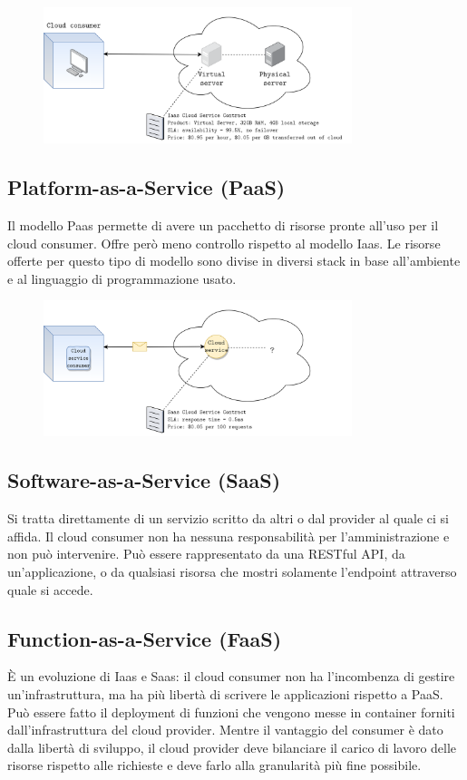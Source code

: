 \begin{figure}[ht]
    \centering
    \includegraphics[width=9cm]{./Images/cap3/3.3.png}
    \label{fig:image3.3}
\end{figure}

\subsection{Platform-as-a-Service (PaaS)}
Il modello Paas permette di avere un pacchetto di risorse pronte all'uso per il cloud consumer. Offre però meno controllo rispetto al modello Iaas. Le risorse offerte per questo tipo di modello sono divise in diversi stack in base all'ambiente e al linguaggio di programmazione usato. 

\begin{figure}[ht]
    \centering
    \includegraphics[width=9cm]{./Images/cap3/3.4.png}
    \label{fig:image3.4}
\end{figure}

\subsection{Software-as-a-Service (SaaS)}
Si tratta direttamente di un servizio scritto da altri o dal provider al quale ci si affida. Il cloud consumer non ha nessuna responsabilità per l'amministrazione e non può intervenire. Può essere rappresentato da una RESTful API, da un'applicazione, o da qualsiasi risorsa che mostri solamente l'endpoint attraverso quale si accede.

\subsection{Function-as-a-Service (FaaS)}
È un evoluzione di Iaas e Saas: il cloud consumer non ha l'incombenza di gestire un'infrastruttura, ma ha più libertà di scrivere le applicazioni rispetto a PaaS. Può essere fatto il deployment di funzioni che vengono messe in container forniti dall'infrastruttura del cloud provider. Mentre il vantaggio del consumer è dato dalla libertà di sviluppo, il cloud provider deve bilanciare il carico di lavoro delle risorse rispetto alle richieste e deve farlo alla granularità più fine possibile. 

